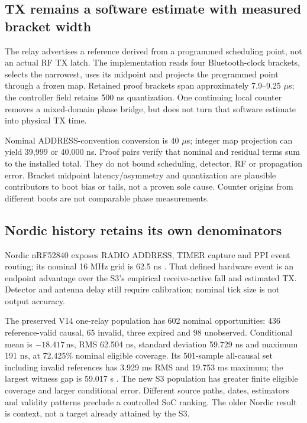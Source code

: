 \documentclass[10pt,letterpaper]{article}
\newcommand{\ns}{\,\mathrm{ns}}\newcommand{\us}{\,\mu\mathrm{s}}\newcommand{\code}[1]{\texttt{#1}}\newcolumntype{L}[1]{>{\RaggedRight\arraybackslash}p{#1}}\renewcommand{\arraystretch}{1.15}
\begin{document}
\subsection{TX remains a software estimate with measured bracket width}
The relay advertises a reference derived from a programmed scheduling point, not an actual RF TX latch. The implementation reads four Bluetooth-clock brackets, selects the narrowest, uses its midpoint and projects the programmed point through a frozen map. Retained proof brackets span approximately 7.9--9.25 $\mu$s; the controller field retains 500 ns quantization. One continuing local counter removes a mixed-domain phase bridge, but does not turn that software estimate into physical TX time.

Nominal ADDRESS-convention conversion is 40 $\mu$s; integer map projection can yield 39,999 or 40,000 ns. Proof pairs verify that nominal and residual terms sum to the installed total. They do not bound scheduling, detector, RF or propagation error. Bracket midpoint latency/asymmetry and quantization are plausible contributors to boot bias or tails, not a proven sole cause. Counter origins from different boots are not comparable phase measurements.

\subsection{Nordic history retains its own denominators}
Nordic nRF52840 exposes RADIO ADDRESS, TIMER capture and PPI event routing; its nominal 16 MHz grid is 62.5 ns \cite{nordic}. That defined hardware event is an endpoint advantage over the S3's empirical receive-active fall and estimated TX. Detector and antenna delay still require calibration; nominal tick size is not output accuracy.

The preserved V14 one-relay population has 602 nominal opportunities: 436 reference-valid causal, 65 invalid, three expired and 98 unobserved. Conditional mean is $-18.417\ns$, RMS 62.504 ns, standard deviation 59.729 ns and maximum 191 ns, at 72.425\% nominal eligible coverage. Its 501-sample all-causal set including invalid references has 3.929 ms RMS and 19.753 ms maximum; the largest witness gap is 59.017 s \cite{v14}. The new S3 population has greater finite eligible coverage and larger conditional error. Different source paths, dates, estimators and validity patterns preclude a controlled SoC ranking. The older Nordic result is context, not a target already attained by the S3.
\newpage
\end{document}
